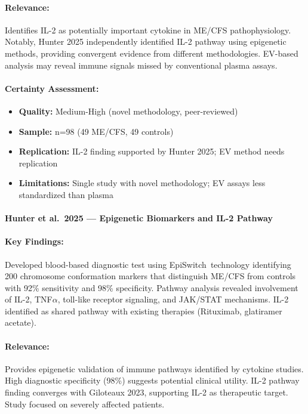 \paragraph{Relevance:}
Identifies IL-2 as potentially important cytokine in ME/CFS pathophysiology. Notably, Hunter 2025 independently identified IL-2 pathway using epigenetic methods, providing convergent evidence from different methodologies. EV-based analysis may reveal immune signals missed by conventional plasma assays.

\paragraph{Certainty Assessment:}
\begin{itemize}
    \item \textbf{Quality:} Medium-High (novel methodology, peer-reviewed)
    \item \textbf{Sample:} n=98 (49 ME/CFS, 49 controls)
    \item \textbf{Replication:} IL-2 finding supported by Hunter 2025; EV method needs replication
    \item \textbf{Limitations:} Single study with novel methodology; EV assays less standardized than plasma
\end{itemize}

\paragraph{Hunter et al.\ 2025 --- Epigenetic Biomarkers and IL-2 Pathway}

\cite{Hunter2025}

\paragraph{Key Findings:}
Developed blood-based diagnostic test using EpiSwitch\textregistered\ technology identifying 200 chromosome conformation markers that distinguish ME/CFS from controls with 92\% sensitivity and 98\% specificity. Pathway analysis revealed involvement of IL-2, TNF$\alpha$, toll-like receptor signaling, and JAK/STAT mechanisms. IL-2 identified as shared pathway with existing therapies (Rituximab, glatiramer acetate).

\paragraph{Relevance:}
Provides epigenetic validation of immune pathways identified by cytokine studies. High diagnostic specificity (98\%) suggests potential clinical utility. IL-2 pathway finding converges with Giloteaux 2023, supporting IL-2 as therapeutic target. Study focused on severely affected patients.

